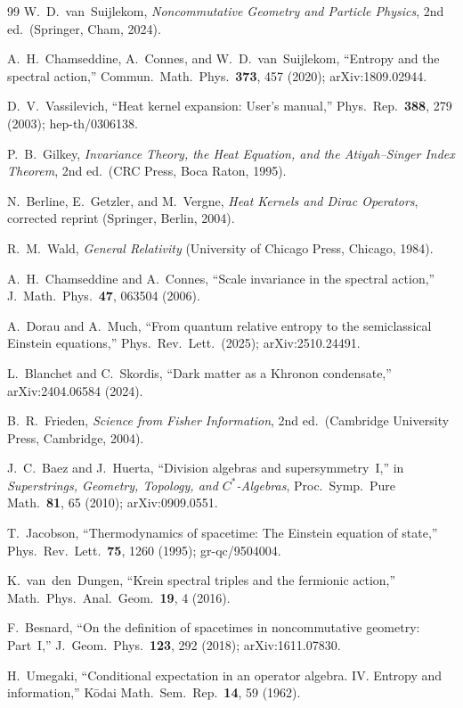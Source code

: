 \documentclass[prd,twocolumn,superscriptaddress,longbibliography]{revtex4-2}
\begin{document}
\begin{thebibliography}{99}
W.~D.~van~Suijlekom,
\emph{Noncommutative Geometry and Particle Physics},
2nd ed.\ (Springer, Cham, 2024).

A.~H.~Chamseddine, A.~Connes, and
W.~D.~van~Suijlekom,
``Entropy and the spectral action,''
Commun.\ Math.\ Phys.\ \textbf{373}, 457 (2020);
arXiv:1809.02944.

D.~V.~Vassilevich,
``Heat kernel expansion: User's manual,''
Phys.\ Rep.\ \textbf{388}, 279 (2003);
hep-th/0306138.

P.~B.~Gilkey,
\emph{Invariance Theory, the Heat Equation, and
the Atiyah--Singer Index Theorem},
2nd ed.\ (CRC Press, Boca Raton, 1995).

N.~Berline, E.~Getzler, and M.~Vergne,
\emph{Heat Kernels and Dirac Operators},
corrected reprint (Springer, Berlin, 2004).

R.~M.~Wald,
\emph{General Relativity}
(University of Chicago Press, Chicago, 1984).

A.~H.~Chamseddine and A.~Connes,
``Scale invariance in the spectral action,''
J.\ Math.\ Phys.\ \textbf{47}, 063504 (2006).

A.~Dorau and A.~Much,
``From quantum relative entropy to the semiclassical
Einstein equations,''
Phys.\ Rev.\ Lett.\ (2025);
arXiv:2510.24491.

L.~Blanchet and C.~Skordis,
``Dark matter as a Khronon condensate,''
arXiv:2404.06584 (2024).

B.~R.~Frieden,
\emph{Science from Fisher Information},
2nd ed.\ (Cambridge University Press, Cambridge, 2004).

J.~C.~Baez and J.~Huerta,
``Division algebras and supersymmetry~I,''
in \emph{Superstrings, Geometry, Topology,
and $C^*$-Algebras}, Proc.\ Symp.\ Pure Math.\
\textbf{81}, 65 (2010);
arXiv:0909.0551.

T.~Jacobson,
``Thermodynamics of spacetime: The Einstein equation
of state,''
Phys.\ Rev.\ Lett.\ \textbf{75}, 1260 (1995);
gr-qc/9504004.

K.~van~den~Dungen,
``Krein spectral triples and the fermionic action,''
Math.\ Phys.\ Anal.\ Geom.\ \textbf{19}, 4 (2016).

F.~Besnard,
``On the definition of spacetimes in noncommutative
geometry: Part~I,''
J.\ Geom.\ Phys.\ \textbf{123}, 292 (2018);
arXiv:1611.07830.

H.~Umegaki,
``Conditional expectation in an operator algebra.
IV. Entropy and information,''
K\=odai Math.\ Sem.\ Rep.\ \textbf{14}, 59 (1962).

\end{thebibliography}
\end{document}
